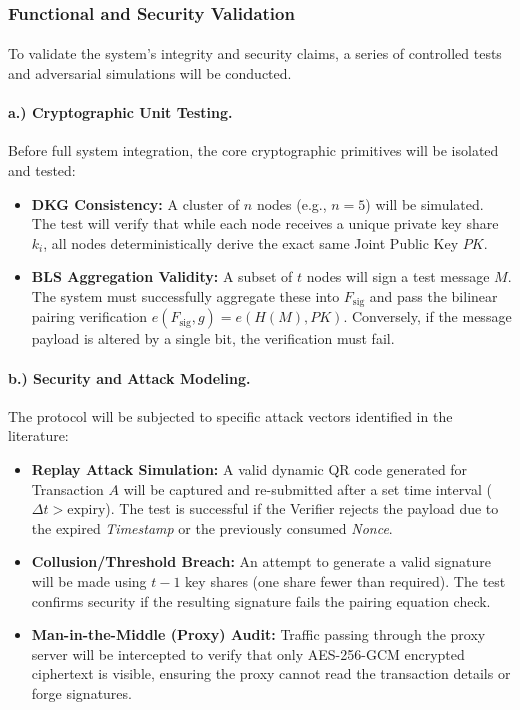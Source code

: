 \documentclass[a4paper]{scl-article}
\begin{document}
\subsubsection{Functional and Security Validation}
\label{sect:meth4_b}
\paragraph{}To validate the system's integrity and security claims, a series of controlled tests and adversarial simulations will be conducted.

\paragraph{a.) Cryptographic Unit Testing.}
Before full system integration, the core cryptographic primitives will be isolated and tested:
\begin{itemize}
    \item \textbf{DKG Consistency:} A cluster of $n$ nodes (e.g., $n=5$) will be simulated. The test will verify that while each node receives a unique private key share $k_i$, all nodes deterministically derive the exact same Joint Public Key $PK$.
    \item \textbf{BLS Aggregation Validity:} A subset of $t$ nodes will sign a test message $M$. The system must successfully aggregate these into $F_{\text{sig}}$ and pass the bilinear pairing verification $e(F_{\text{sig}}, g) = e(H(M), PK)$. Conversely, if the message payload is altered by a single bit, the verification must fail.
\end{itemize}

\paragraph{b.) Security and Attack Modeling.}
The protocol will be subjected to specific attack vectors identified in the literature:
\begin{itemize}
    \item \textbf{Replay Attack Simulation:} A valid dynamic QR code generated for Transaction $A$ will be captured and re-submitted after a set time interval ($\Delta t > \text{expiry}$). The test is successful if the Verifier rejects the payload due to the expired \textit{Timestamp} or the previously consumed \textit{Nonce}.
    \item \textbf{Collusion/Threshold Breach:} An attempt to generate a valid signature will be made using $t-1$ key shares (one share fewer than required). The test confirms security if the resulting signature fails the pairing equation check.
    \item \textbf{Man-in-the-Middle (Proxy) Audit:} Traffic passing through the proxy server will be intercepted to verify that only AES-256-GCM encrypted ciphertext is visible, ensuring the proxy cannot read the transaction details or forge signatures.
\end{itemize}
\end{document}
